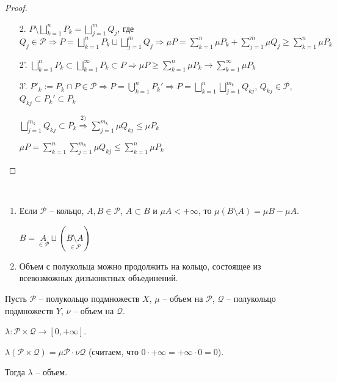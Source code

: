 \begin{proof}~
    \begin{enumerate}
        \item[2.] $P\setminus \bigsqcup\limits_{k=1}^n P_k = \bigsqcup\limits_{j=1}^m Q_j$, где $Q_j \in \mathcal{P}\Rightarrow
        P = \bigsqcup\limits_{k=1}^n P_k \sqcup \bigsqcup\limits_{j=1}^m Q_j\Rightarrow \mu P = \sum\limits_{k=1}^n \mu P_k +
        \sum\limits_{j=1}^m \mu Q_j \geq \sum\limits_{k=1}^n \mu P_k$

        \item[2'.] $\bigsqcup\limits_{k=1}^n P_k \subset \bigsqcup\limits_{k=1}^\infty P_k \subset P \Rightarrow
        \mu P \geq \sum\limits_{k=1}^n \mu P_k \rightarrow \sum\limits_{k=1}^\infty \mu P_k$
        \item[3'.] $P'_k:= P_k \cap P \in \mathcal{P} \Rightarrow P = \bigcup\limits_{k=1}^n P_k' \Rightarrow P = \bigsqcup\limits_{k=1}^n \bigsqcup\limits_{j=1}^{m_k} Q_{kj}$, 
        $Q_{kj}\in \mathcal{P}$, $Q_{kj}\subset P_k' \subset P_k$

        $\bigsqcup\limits_{j=1}^{m_k} Q_{kj} \subset P_k \overset{2)}{\Rightarrow} \sum\limits_{j=1}^{m_k}\mu Q_{kj} \leq \mu P_k$

        $\mu P =  \sum\limits_{k=1}^{n} \sum\limits_{j=1}^{m_k} \mu Q_{kj} \leq  \sum\limits_{k=1}^{n} \mu P_k$
    \end{enumerate}
\end{proof}

\begin{remark}~
    \begin{enumerate} 
        \item Если $\mathcal{P}$ – кольцо, $A, B\in \mathcal{P}$, $A\subset B$ и $\mu A <+\infty$, то $\mu (B \setminus A)=\mu B - \mu A$.
        
        $B = \underset{\in \mathcal{P}}{A}\sqcup (\underset{\in \mathcal{P}}{B\setminus A})$
        \item Объем с полукольца можно продолжить на кольцо, состоящее из всевозможных дизъюнктных объединений.
    \end{enumerate}
\end{remark}

\begin{theorem}
    Пусть $\mathcal{P}$ – полукольцо подмножеств $X$, $\mu$ – объем на $\mathcal{P}$, 
    $\mathcal{Q}$ – полукольцо подмножеств $Y$, $\nu$ – объем на $\mathcal{Q}$.

    $\lambda: \mathcal{P}\times \mathcal{Q}\rightarrow [0, +\infty]$.

    $\lambda(\mathcal{P}\times \mathcal{Q}) = \mu \mathcal{P} \cdot \nu \mathcal{Q}$ (считаем,
    что $0 \cdot + \infty = +\infty \cdot 0 = 0$). 
    
    Тогда $\lambda$ – объем.
\end{theorem}

